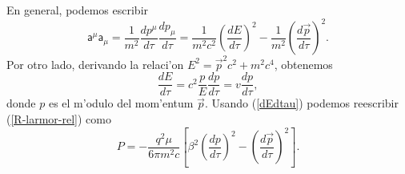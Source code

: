 En general, podemos escribir
\begin{equation}
\mathsf{a}^\mu\mathsf{a}_\mu=\frac{1}{m^2}\frac{dp^\mu}{d\tau}\frac{dp_\mu}{
d\tau}=\frac{1}{m^2c^2}\left( \frac{dE}{d\tau}\right)^2-\frac{1}{m^2}\left(
\frac{d\vec{p}}{d\tau}\right)^2.
\end{equation}
Por otro lado, derivando la relaci'on $E^2=\vec{p}^2c^2+m^2c^4$, obtenemos
\begin{equation}
\frac{dE}{d\tau}=c^2\frac{p}{E}\frac{dp}{d\tau}=v\frac{dp}{d\tau},
\label{dEdtau}
\end{equation}
donde $p$ es el m'odulo del mom'entum $\vec{p}$. Usando (\ref{dEdtau}) podemos
reescribir (\ref{R-larmor-rel}) como
\begin{equation}
P=-\frac{q^2\mu}{6\pi m^2c}\left[ \beta^2\left(
\frac{dp}{d\tau}\right)^2-\left( \frac{d\vec{p}}{d\tau}\right)^2\right] .
\label{4a2-2}
\end{equation}

